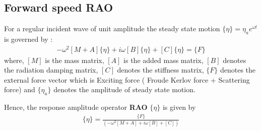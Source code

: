 \subsection{Forward speed RAO}
For a regular incident wave of unit amplitude the steady state motion  $\{\eta\} = \eta_a e^{\omega t}$
is governed by :
\begin{align}
    -\omega^2[M + A]\{\eta\} + i\omega[B]\{\eta\} + [C]\{\eta\} = \{F\}
\end{align}
where, $[M]$ is the mass matrix, $[A]$ is the added mass matrix, 
$[B]$ denotes the radiation damping matrix, $[C]$ denotes the stiffness matrix, 
$\{F\}$ denotes the external force vector which is Exciting force ( Froude Kerlov force + Scattering force) 
and $\{\eta_a\}$ denotes the amplitude of steady state motion. 

Hence, the response amplitude operator {\bf RAO} $\{\eta\}$ is given by  
\begin{align}
    \{\eta\} = \frac {\{F\}}{\left(-\omega^2[M + A] + i\omega[B] + [C]\right)}
\end{align}
